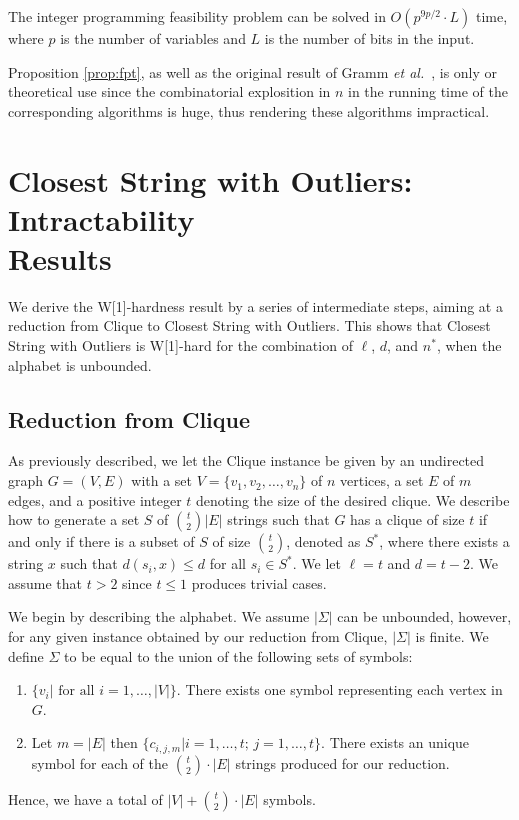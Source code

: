 \begin{theorem} \cite{Len} The integer programming feasibility problem can be solved in $O(p^{9p/2} \cdot L)$ time, where $p$ is the number of variables and $L$ is the number of bits in the input.  \end{theorem}

\noindent Proposition \ref{prop:fpt}, as well as the original result of Gramm {\em et al.}\ \cite{GNR03}, is only or theoretical use since the combinatorial explosition in $n$ in the running time of the corresponding algorithms is huge, thus rendering these algorithms impractical.


\section{{\sc Closest String with Outliers}: Intractability \\ Results}

We derive the W[1]-hardness result by a series of intermediate steps, aiming at a reduction from {\sc Clique} to {\sc Closest String with Outliers}.  This shows that {\sc Closest String with Outliers} is W[1]-hard for the combination of $\ell$, $d$, and $n^*$, when the alphabet is unbounded.  

\subsection{Reduction from {\sc Clique}} \label{w1_construction}

As previously described, we let the {\sc Clique} instance be given by an undirected graph $G=(V, E)$ with a set $V=\{v_1, v_2, \ldots, v_n\}$ of $n$ vertices, a set $E$ of $m$ edges, and a positive integer $t$ denoting the size of the desired clique.  We describe how to generate a set $S$ of ${{t}\choose{2}} |E|$ strings such that $G$ has a clique of size $t$ if and only if there is a subset of $S$ of size ${{t}\choose{2}}$, denoted as $S^*$, where there exists a string $x$ such that $d(s_i, x) \leq d$ for all $s_i \in S^*$.  We let $\ell = t$ and $d = t - 2$.  We assume that $t > 2$ since $t \leq 1$ produces trivial cases.  
 
We begin by describing the alphabet.  We assume $|\Sigma|$ can be unbounded, however, for any given instance obtained by our reduction from {\sc Clique}, $|\Sigma|$ is finite.  We define $\Sigma$ to be equal to the union of the following sets of symbols:
\begin{enumerate}
\item $\{v_i | \mbox{  for all } i = 1, \ldots, |V|\}$.  There exists one symbol representing each vertex in $G$.
\item Let $m = |E|$ then $\{c_{i,j,m} | i = 1, \ldots, t; \, j = 1, \ldots, t\}$.  There exists an unique symbol for each of the ${t\choose 2} \cdot |E|$ strings produced for our reduction. 
\end{enumerate}
Hence, we have a total of $|V| + {t\choose 2} \cdot |E|$ symbols.
 
